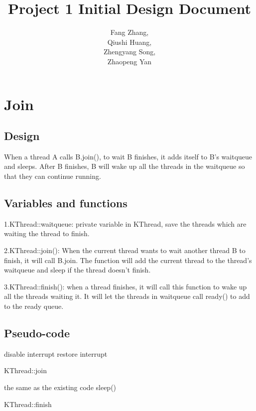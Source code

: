 \documentclass[a4paper,10pt]{article}
\title{Project 1 Initial Design Document}
\author{Fang Zhang,\\
Qiushi Huang,\\
Zhengyang Song,\\
Zhaopeng Yan
}
\begin{document}
\maketitle

\section{Join}

\subsection{Design}

When a thread A calls B.join(), to wait B finishes, it adds itself to B's waitqueue and sleeps. After B finishes, B will wake up all the threads in the waitqueue so that they can continue running.

\subsection{Variables and functions}

1.KThread::waitqueue: private variable in KThread, save the threads which are waiting the thread to finish.

2.KThread::join(): When the current thread wants to wait another thread B to finish, it will call B.join. The function will add the current thread to the thread's waitqueue and sleep if the thread doesn't finish.

3.KThread::finish(): when a thread finishes, it will call this function to wake up all the threads waiting it. It will let the threads in waitqueue call ready() to add to the ready queue.

\subsection{Pseudo-code}

\begin{algorithm}
\DontPrintSemicolon %
disable interrupt\;
restore interrupt\;
\caption{KThread::join}
\label{algo:change}
\end{algorithm}

\begin{algorithm}
\DontPrintSemicolon %
the same as the existing code\;
sleep()
\caption{KThread::finish}
\label{algo:change}
\end{algorithm}
\end{document}
